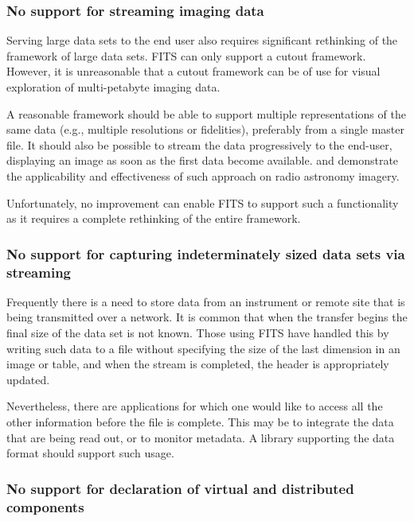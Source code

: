 \documentclass[final,authoryear,5p,times,twocolumn]{elsarticle}
\begin{document}
{{\subsubsection{No support for streaming imaging data}
\label{subsection_stream_image}

Serving large data sets to the end user also requires significant
rethinking of the framework of large data sets. FITS can only support a
cutout framework.  However, it is unreasonable that a cutout framework
can be of use for visual exploration of multi-petabyte imaging data.

A reasonable framework should be able to support multiple representations
of the same data (e.g., multiple resolutions or fidelities), preferably
from a single master file. It should also be possible to stream the data
progressively to the end-user, displaying an image as soon
as the first data become available. \citet{2014Kitaeff} and
\citet{2014arXiv1401.7433P}  demonstrate the applicability and effectiveness
of such approach on radio astronomy imagery.

Unfortunately, no improvement can enable FITS to support
such a functionality as it requires a complete rethinking of the entire framework.


\subsubsection{No support for capturing indeterminately sized data sets via streaming}
\label{subsection_stream_indeterm}


Frequently there is a need to store data from an instrument or remote
site that is being transmitted over a network. It is common that when
the transfer begins the final size of the data set is not known. Those
using FITS have handled this by writing such data to a file without
specifying the size of the last dimension in an image or table, and
when the stream is completed, the header is appropriately updated.


Nevertheless, there are applications for which one would like to
access all the other information before the file is complete. This may
be to integrate the data that are being read out, or to monitor
metadata. A library supporting the data format should support such
usage.


\subsubsection{No support for declaration of virtual and distributed components}
\label{subsection_virt_dist_components}


}}
\end{document}
